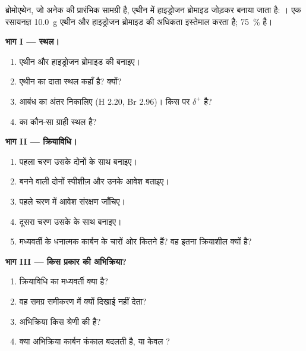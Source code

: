 \begin{problem}[{सप्ताहांत समस्या --- दस ग्राम एथीन से: कितना
ब्रोमोएथेन?}]
\label{pb:g12:curly-arrows:1}
ब्रोमोएथेन, जो अनेक  की प्रारंभिक सामग्री है, एथीन में
हाइड्रोजन ब्रोमाइड जोड़कर बनाया जाता है: । एक रसायनज्ञ
\qty{10.0}{g} एथीन और हाइड्रोजन ब्रोमाइड की अधिकता इस्तेमाल करता है;
 \qty{75}{\percent} है।

\medskip
\noindent\textbf{भाग I --- स्थल।}
\begin{enumerate}
  \item एथीन और हाइड्रोजन ब्रोमाइड की  बनाइए।
  \item एथीन का दाता स्थल कहाँ है? क्यों?
  \item {} आबंध का  अंतर निकालिए
        (H 2.20, Br 2.96)। किस  पर $\delta^+$ है?
  \item {} का कौन-सा  ग्राही स्थल है?
\end{enumerate}

\medskip
\noindent\textbf{भाग II --- क्रियाविधि।}
\begin{enumerate}[resume]
  \item पहला चरण उसके दोनों  के साथ बनाइए।
  \item बनने वाली दोनों स्पीशीज़ और उनके आवेश बताइए।
  \item पहले चरण में आवेश संरक्षण जाँचिए।
  \item दूसरा चरण उसके  के साथ बनाइए।
  \item मध्यवर्ती के धनात्मक कार्बन के चारों ओर कितने  हैं?
        वह इतना क्रियाशील क्यों है?
\end{enumerate}

\medskip
\noindent\textbf{भाग III --- किस प्रकार की अभिक्रिया?}
\begin{enumerate}[resume]
  \item क्रियाविधि का मध्यवर्ती क्या है?
  \item वह समग्र समीकरण में क्यों दिखाई नहीं देता?
  \item अभिक्रिया किस श्रेणी की है?
  \item क्या अभिक्रिया कार्बन कंकाल बदलती है, या केवल
        ?
\end{enumerate}


\end{problem}
